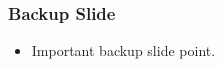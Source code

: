 \documentclass{beamer}
\begin{document}
\begin{frame}
\frametitle{Backup Slide}

\begin{itemize}
\item Important backup slide point.
\end{itemize}

\end{frame}

\setcounter{framenumber}{\value{finalframe}}
\end{document}
